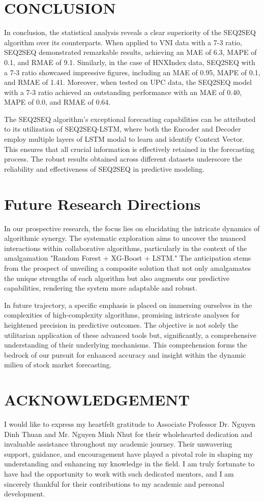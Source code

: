 \documentclass{ieeeojies}
\begin{document}
\section{CONCLUSION}
In conclusion, the statistical analysis reveals a clear superiority of the SEQ2SEQ algorithm over its counterparts. When applied to VNI data with a 7-3 ratio, SEQ2SEQ demonstrated remarkable results, achieving an MAE of 6.3, MAPE of 0.1, and RMAE of 9.1. Similarly, in the case of HNXIndex data, SEQ2SEQ with a 7-3 ratio showcased impressive figures, including an MAE of 0.95, MAPE of 0.1, and RMAE of 1.41. Moreover, when tested on UPC data, the SEQ2SEQ model with a 7-3 ratio achieved an outstanding performance with an MAE of 0.40, MAPE of 0.0, and RMAE of 0.64.

The SEQ2SEQ algorithm's exceptional forecasting capabilities can be attributed to its utilization of SEQ2SEQ-LSTM, where both the Encoder and Decoder employ multiple layers of LSTM modal to learn and identify Context Vector. This ensures that all crucial information is effectively retained in the forecasting process. The robust results obtained across different datasets underscore the reliability and effectiveness of SEQ2SEQ in predictive modeling.

\section{Future Research Directions}
In our prospective research, the focus lies on elucidating the intricate dynamics of algorithmic synergy. The systematic exploration aims to uncover the nuanced interactions within collaborative algorithms, particularly in the context of the amalgamation "Random Forest + XG-Boost + LSTM." The anticipation stems from the prospect of unveiling a composite solution that not only amalgamates the unique strengths of each algorithm but also augments our predictive capabilities, rendering the system more adaptable and robust.

In future trajectory, a specific emphasis is placed on immersing ourselves in the complexities of high-complexity algorithms, promising intricate analyses for heightened precision in predictive outcomes. The objective is not solely the utilitarian application of these advanced tools but, significantly, a comprehensive understanding of their underlying mechanisms. This comprehension forms the bedrock of our pursuit for enhanced accuracy and insight within the dynamic milieu of stock market forecasting.
\section{ACKNOWLEDGEMENT}
I would like to express my heartfelt gratitude to Associate Professor Dr. Nguyen Dinh Thuan and Mr. Nguyen Minh Nhut for their wholehearted dedication and invaluable assistance throughout my academic journey. Their unwavering support, guidance, and encouragement have played a pivotal role in shaping my understanding and enhancing my knowledge in the field. I am truly fortunate to have had the opportunity to work with such dedicated mentors, and I am sincerely thankful for their contributions to my academic and personal development.
\end{document}
